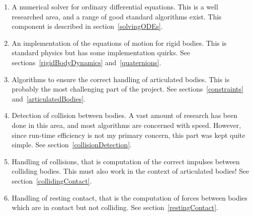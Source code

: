 \begin{enumerate}
\item A numerical solver for ordinary differential equations. This is a well researched area, and
    a range of good standard algorithms exist. This component is described in
    section~\ref{solvingODEs}.
\item An implementation of the equations of motion for rigid bodies. This is standard physics but
    has some implementation quirks. See sections~\ref{rigidBodyDynamics} and~\ref{quaternions}.
\item Algorithms to ensure the correct handling of articulated bodies. This is probably the most
    challenging part of the project. See sections~\ref{constraints} and~\ref{articulatedBodies}.
\item Detection of collision between bodies. A vast amount of research has been done in this area,
    and most algorithms are concerned with speed. However, since run-time efficiency is not my
    primary concern, this part was kept quite simple. See section~\ref{collisionDetection}.
\item Handling of collisions, that is computation of the correct impulses between colliding
    bodies. This must also work in the context of articulated bodies!
    See section~\ref{collidingContact}.
\item Handling of resting contact, that is the computation of forces between bodies which are in
    contact but not colliding. See section~\ref{restingContact}.
\end{enumerate}
